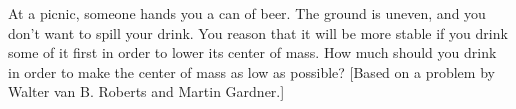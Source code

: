 At a picnic, someone hands you a can of beer. The ground is uneven,
and you don't want to spill your drink. You reason that it will be
more stable if you drink some of it first in order to lower its
center of mass. How much should you drink in order to make the center
of mass as low as possible? [Based on a problem by Walter van B. Roberts and
Martin Gardner.]

